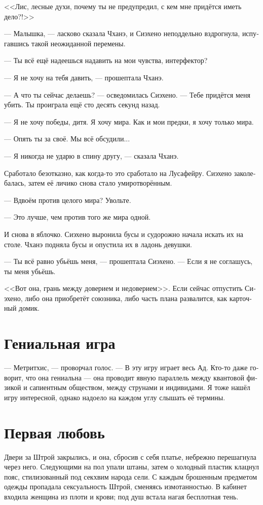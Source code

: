 \documentclass[a4paper,12pt,fleqn]{book}\usepackage{polyglossia}\setdefaultlanguage[babelshorthands=true]{russian}\setotherlanguage{english}\defaultfontfeatures{Ligatures=TeX,Mapping=tex-text}\usepackage{xcolor}\newcommand{\ml}[3]{#2}
\begin{document}
{<<Лис, лесные духи, почему ты не предупредил, с кем мне придётся иметь дело?!>>

--- Малышка, --- ласково сказала Чханэ, и Сиэхено неподдельно вздрогнула, испугавшись такой неожиданной перемены.

--- Ты всё ещё надеешься надавить на мои чувства, интерфектор?

--- Я не хочу на тебя давить, --- прошептала Чханэ.

--- А что ты сейчас делаешь? --- осведомилась Сиэхено.
--- Тебе придётся меня убить.
Ты проиграла ещё сто десять секунд назад.

--- Я не хочу победы, дитя.
Я хочу мира.
Как и мои предки, я хочу только мира.

--- Опять ты за своё.
Мы всё обсудили...

--- Я никогда не ударю в спину другу, --- сказала Чханэ.

Сработало безотказно, как когда-то это сработало на Лусафейру.
Сиэхено заколебалась, затем её личико снова стало умиротворённым.

--- Вдвоём против целого мира?
Увольте.

--- Это лучше, чем против того же мира одной.

И снова в яблочко.
Сиэхено выронила бусы и судорожно начала искать их на столе.
Чханэ подняла бусы и опустила их в ладонь девушки.

--- Ты всё равно убьёшь меня, --- прошептала Сиэхено.
--- Если я не соглашусь, ты меня убьёшь.

<<Вот она, грань между доверием и недоверием>>.
Если сейчас отпустить Сиэхено, либо она приобретёт союзника, либо часть плана развалится, как карточный домик.

\section{Гениальная игра}

--- Метритхис, --- проворчал голос.
--- В эту игру играет весь Ад.
Кто-то даже говорит, что она гениальна --- она проводит явную параллель между квантовой физикой и сапиентным обществом, между струнами и индивидами.
Я тоже нашёл игру интересной, однако надоело на каждом углу слышать её термины.

\section{Первая любовь}

Двери за Штрой закрылись, и она, сбросив с себя платье, небрежно перешагнула через него.
Следующими на пол упали штаны, затем о холодный пластик клацнул пояс, стилизованный под секхвим народа сели.
С каждым брошенным предметом одежды пропадала сексуальность Штрой, сменяясь измотанностью.
В кабинет входила женщина из плоти и крови;
под душ встала нагая бесплотная тень.

}
\end{document}
